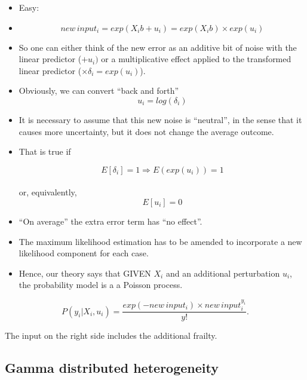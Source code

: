 \documentclass[10pt,english]{beamer}
\def\lyxframeend{} %
\begin{document}
\lyxframeend{}
\begin{itemize}
\item Easy:
\item 
\[
new\, input_{i}=exp(X_{i}b+u_{i})=exp(X_{i}b)\times exp(u_{i})
\]

\item So one can either think of the new error as an additive bit of noise
with the linear predictor ($+u_{i})$ or a multiplicative effect applied
to the transformed linear predictor ($\times\delta_{i}=exp(u_{i})$). 
\item Obviously, we can convert ``back and forth'' 
\[
u_{i}=log(\delta_{i})
\]

\end{itemize}

\lyxframeend{}
\begin{itemize}
\item It is necessary to assume that this new noise is ``neutral'', in
the sense that it causes more uncertainty, but it does not change
the average outcome. 
\item That is true if


\[
E[\delta_{i}]=1\Longrightarrow E(exp(u_{i}))=1
\]
\\
or, equivalently, 
\[
E[u_{i}]=0
\]


\item ``On average'' the extra error term has ``no effect''.
\end{itemize}

\lyxframeend{}
\begin{itemize}
\item The maximum likelihood estimation has to be amended to incorporate
a new likelihood component for each case. 
\item Hence, our theory says that GIVEN $X_{i}$ and an additional perturbation
$u_{i}$, the probability model is a a Poisson process.
\end{itemize}
\[
P(y_{i}|X_{i},u_{i})=\frac{exp(-new\, input_{i})\times new\, input_{i}^{y_{i}}}{y!}.
\]


The input on the right side includes the additional frailty.


\lyxframeend{}\subsection{Gamma distributed heterogeneity}
\end{document}
